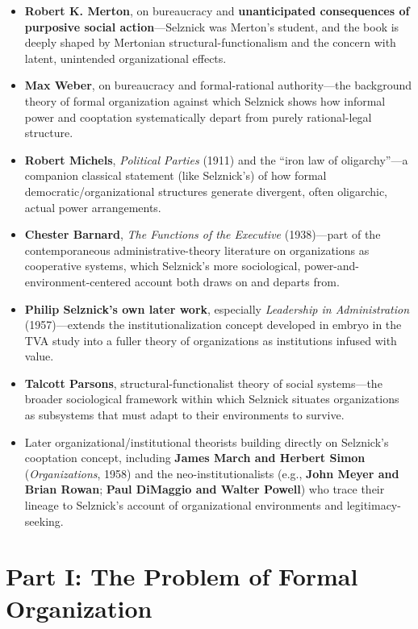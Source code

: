 \documentclass[12pt]{article}
\begin{document}
\begin{itemize}[leftmargin=*, itemsep=4pt]
    \item \textbf{Robert K. Merton}, on bureaucracy and \textbf{unanticipated consequences of purposive social action}---Selznick was Merton's student, and the book is deeply shaped by Mertonian structural-functionalism and the concern with latent, unintended organizational effects.
    \item \textbf{Max Weber}, on bureaucracy and formal-rational authority---the background theory of formal organization against which Selznick shows how informal power and cooptation systematically depart from purely rational-legal structure.
    \item \textbf{Robert Michels}, \textit{Political Parties} (1911) and the ``iron law of oligarchy''---a companion classical statement (like Selznick's) of how formal democratic/organizational structures generate divergent, often oligarchic, actual power arrangements.
    \item \textbf{Chester Barnard}, \textit{The Functions of the Executive} (1938)---part of the contemporaneous administrative-theory literature on organizations as cooperative systems, which Selznick's more sociological, power-and-environment-centered account both draws on and departs from.
    \item \textbf{Philip Selznick's own later work}, especially \textit{Leadership in Administration} (1957)---extends the institutionalization concept developed in embryo in the TVA study into a fuller theory of organizations as institutions infused with value.
    \item \textbf{Talcott Parsons}, structural-functionalist theory of social systems---the broader sociological framework within which Selznick situates organizations as subsystems that must adapt to their environments to survive.
    \item Later organizational/institutional theorists building directly on Selznick's cooptation concept, including \textbf{James March and Herbert Simon} (\textit{Organizations}, 1958) and the neo-institutionalists (e.g., \textbf{John Meyer and Brian Rowan}; \textbf{Paul DiMaggio and Walter Powell}) who trace their lineage to Selznick's account of organizational environments and legitimacy-seeking.
\end{itemize}

\section{Part I: The Problem of Formal Organization}
\end{document}
